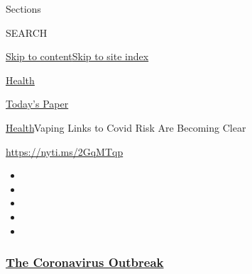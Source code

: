 Sections

SEARCH

\protect\hyperlink{site-content}{Skip to
content}\protect\hyperlink{site-index}{Skip to site index}

\href{https://www.nytimes3xbfgragh.onion/section/health}{Health}

\href{https://myaccount.nytimes3xbfgragh.onion/auth/login?response_type=cookie\&client_id=vi}{}

\href{https://www.nytimes3xbfgragh.onion/section/todayspaper}{Today's
Paper}

\href{/section/health}{Health}\textbar{}Vaping Links to Covid Risk Are
Becoming Clear

\url{https://nyti.ms/2GqMTqp}

\begin{itemize}
\item
\item
\item
\item
\item
\end{itemize}

\hypertarget{the-coronavirus-outbreak}{%
\subsubsection{\texorpdfstring{\href{https://www.nytimes3xbfgragh.onion/news-event/coronavirus?name=styln-coronavirus-national\&region=TOP_BANNER\&block=storyline_menu_recirc\&action=click\&pgtype=Article\&impression_id=197cf000-f1be-11ea-82b8-c746ff1e5987\&variant=undefined}{The
Coronavirus
Outbreak}}{The Coronavirus Outbreak}}\label{the-coronavirus-outbreak}}

